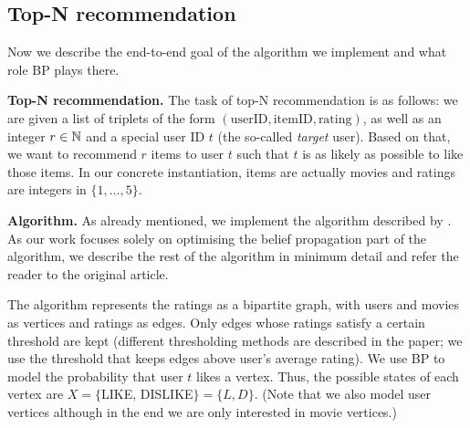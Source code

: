 \documentclass[letterpaper]{article}
\newcommand{\mypar}[1]{{\bf #1.}}
\begin{document}
\subsection{Top-N recommendation} \label{subsec:topn}

Now we describe the end-to-end goal of the algorithm we implement and what role
BP plays there.

\mypar{Top-N recommendation} The task of top-N recommendation is as follows: we
are given a list of triplets of the form $(\text{userID}, \text{itemID},
\text{rating})$, as well as an integer $r\in\mathbb{N}$ and a special user ID $t$ (the
so-called \emph{target} user). Based on that, we want to recommend $r$ items to
user $t$ such that $t$ is as likely as possible to like those items.
%
In our concrete instantiation, items are actually movies and ratings are
integers in $\{1, \ldots, 5\}$.

\mypar{Algorithm} As already mentioned, we implement the algorithm described by
\citet{top-n-recommendation}. As our work focuses solely on optimising the
belief propagation part of the algorithm, we describe the rest of the algorithm
in minimum detail and refer the reader to the original article.

The algorithm represents the ratings as a bipartite graph, with users and
movies as vertices and ratings as edges. Only edges whose ratings satisfy a
certain threshold are kept (different thresholding methods are described in the
paper; we use the threshold that keeps edges above user's average rating). We use BP to model the probability that user $t$ likes a vertex. Thus,
the possible states of each vertex are $X = \{$LIKE, DISLIKE$\} =
\{L, D\}$. (Note that we also model user vertices although in the end we are
only interested in movie vertices.)
\end{document}

